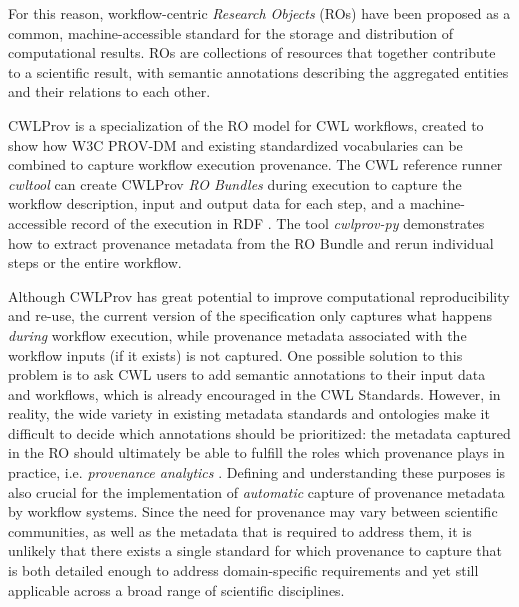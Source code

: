 For this reason, workflow-centric \emph{Research Objects} (ROs) \cite{belhajjame_2012} have been proposed as a common, machine-accessible standard for the storage and distribution of computational results. ROs are collections of resources that together contribute to a scientific result, with semantic annotations describing the aggregated entities and their relations to each other. %


CWLProv \cite{khan-sharing-2019} is a specialization of the RO model for CWL workflows, created to show how W3C PROV-DM \cite{PROVDM} and existing standardized vocabularies can be combined to capture workflow execution provenance. The CWL reference runner \emph{cwltool} \cite{crusoeCommonworkflowlanguageCwltool202305131557342023} can create CWLProv \emph{RO Bundles} during execution to capture the workflow description, input and output data for each step, and a machine-accessible record of the execution in RDF \cite{cyganiakRDFConceptsAbstract2014}. The tool \emph{cwlprov-py} \cite{soiland-reyesCommonworkflowlanguageCwlprovpy2022} demonstrates how to extract provenance metadata from the RO Bundle and rerun individual steps or the entire workflow.


Although CWLProv has great potential to improve computational reproducibility and re-use, the current version of the specification only captures what happens \emph{during} workflow execution, while provenance metadata associated with the workflow inputs (if it exists) is not captured. 
One possible solution to this problem is to ask CWL users to add semantic annotations to their input data and workflows, which is already encouraged in the CWL Standards.
However, in reality, the wide variety in existing metadata standards and ontologies
make it difficult to decide which annotations should be prioritized: the metadata captured in the RO should ultimately be able to fulfill the roles which provenance plays in practice, i.e. \emph{provenance analytics} \cite{Missier2016}. 
Defining and understanding these purposes is also crucial for the implementation of \emph{automatic} capture of provenance metadata by workflow systems. 
Since the need for provenance may vary between scientific communities, as well as the metadata that is required to address them, it is unlikely that there exists a single standard for which provenance to capture that is both detailed enough to address domain-specific requirements and yet still applicable across a broad range of scientific disciplines. %

